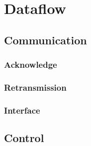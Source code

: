 %
%
\chapter{Dataflow} \label{chapt:dataflow}

\section{Communication}

\subsection{Acknowledge}

\subsection{Retransmission}

\subsection{Interface}

\section{Control}

